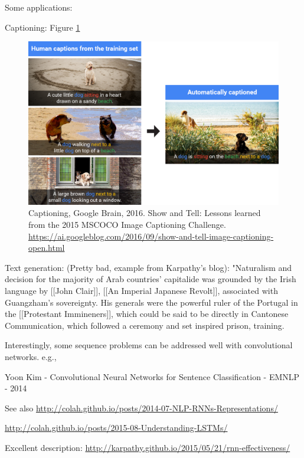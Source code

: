 \documentclass[english]{article}
\begin{document}
\item Some applications: 

Captioning: Figure \ref{c}

\begin{figure}
  \centering
  \includegraphics[scale=0.4]{Caption4.png}
    \caption{Captioning,  Google Brain, 2016. Show and Tell: Lessons learned from the 2015 MSCOCO Image Captioning Challenge. \url{https://ai.googleblog.com/2016/09/show-and-tell-image-captioning-open.html}}
    \label{c}
\end{figure}

Text generation: (Pretty bad, example from Karpathy's blog): "Naturalism and decision for the majority of Arab countries' capitalide was grounded
by the Irish language by [[John Clair]], [[An Imperial Japanese Revolt]], associated  with Guangzham's sovereignty. His generals were the powerful ruler of the Portugal 
in the [[Protestant Immineners]], which could be said to be directly in Cantonese 
Communication, which followed a ceremony and set inspired prison, training.

\item Interestingly, some sequence problems can be addressed well with convolutional networks. e.g., 

Yoon Kim - Convolutional Neural Networks for Sentence Classification - EMNLP - 2014



\item See also \url{http://colah.github.io/posts/2014-07-NLP-RNNs-Representations/}

\url{http://colah.github.io/posts/2015-08-Understanding-LSTMs/}

Excellent description: \url{http://karpathy.github.io/2015/05/21/rnn-effectiveness/}
\end{document}
